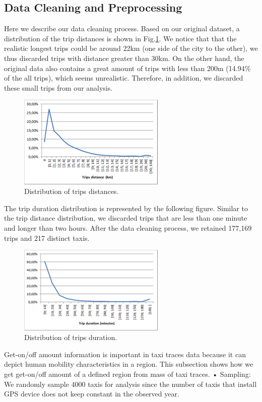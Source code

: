 \documentclass[a4paper, 10pt, conference]{ieeeconf}      %
\begin{document}
\subsection{Data Cleaning and Preprocessing}
Here we describe our data cleaning process. Based on our original dataset, a distribution of the trip distances is shown in Fig.\ref{fig:my_png_3}. We notice that that the realistic longest trips could be around 22km (one side of the city to the other), we thus discarded trips with distance greater than 30km. On the other hand, the original data also contains a great amount of trips with less than 200m (14.94\% of the all trips), which seems unrealistic. Therefore, in addition, we discarded these small trips from our analysis.  
\begin{figure}[htbp]
    \centering
    \includegraphics[width=7cm]{fig/png3.png}
    \caption{ Distribution of trips distances. }
    \label{fig:my_png_3}
\end{figure}
The trip duration distribution is represented by the following figure. Similar to the trip distance distribution, we discarded trips that are less than one minute and longer than two hours. After the data cleaning process, we retained 177,169 trips and 217 distinct taxis. 
 \begin{figure}[htbp]
    \centering
    \includegraphics[width=7cm]{fig/png4.png}
    \caption{Distribution of trips duration. }
    \label{fig:my_png_4}
\end{figure}


Get-on/off amount information is important in taxi traces data because it can depict human mobility characteristics in a region. This subsection shows how we get get-on/off amount of a defined region from mass of taxi traces. • Sampling: We randomly sample 4000 taxis for analysis since the number of taxis that install GPS device does not keep constant in the observed year.
\end{document}
